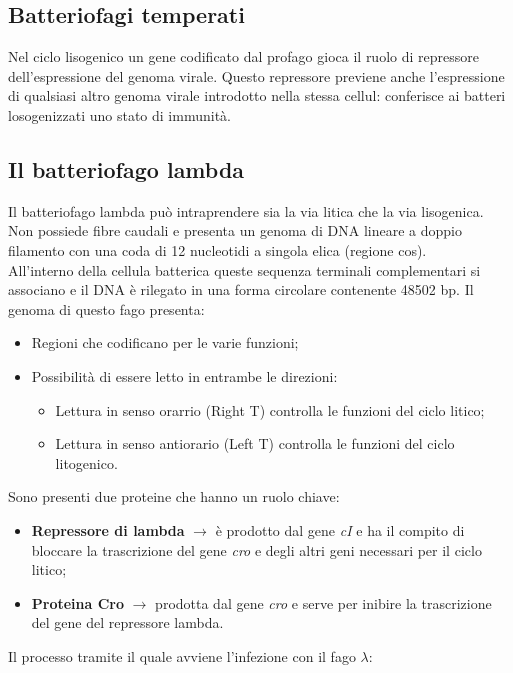 \subsection{Batteriofagi temperati}
Nel ciclo lisogenico un gene codificato dal profago gioca il ruolo di repressore dell'espressione del genoma virale. Questo repressore previene anche l'espressione di qualsiasi altro genoma virale introdotto nella stessa cellul: conferisce ai batteri losogenizzati uno stato di immunità.
\subsection{Il batteriofago lambda}
Il batteriofago lambda può intraprendere sia la via litica che la via lisogenica. Non possiede fibre caudali e presenta un genoma di DNA lineare a doppio filamento con una coda di 12 nucleotidi a singola elica (regione cos). 
\\All'interno della cellula batterica queste sequenza terminali complementari si associano e il DNA è rilegato in una forma circolare contenente 48502 bp. Il genoma di questo fago presenta:
\begin{itemize}
    \item Regioni che codificano per le varie funzioni; 
    \item Possibilità di essere letto in entrambe le direzioni:
    \begin{itemize}
        \item Lettura in senso orarrio (Right T) controlla le funzioni del ciclo litico; 
        \item Lettura in senso antiorario (Left T) controlla le funzioni del ciclo litogenico.
    \end{itemize}
\end{itemize}
Sono presenti due proteine che hanno un ruolo chiave:    
\begin{itemize}
    \item \textbf{Repressore di lambda} $\xrightarrow{}$ è prodotto dal gene \textit{cI} e ha il compito di bloccare la trascrizione del gene \textit{cro} e degli altri geni necessari per il ciclo litico; 
    \item \textbf{Proteina Cro} $\xrightarrow{}$ prodotta dal gene \textit{cro} e serve per inibire la trascrizione del gene del repressore lambda. 
\end{itemize}
Il processo tramite il quale avviene l'infezione con il fago $\lambda$:
